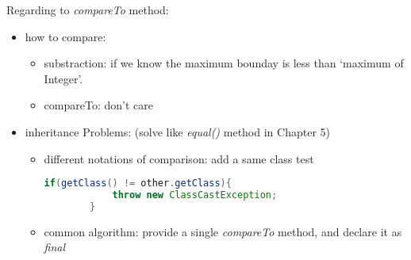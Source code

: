 \documentclass[12pt]{article}
\begin{document}
Regarding to \textit{compareTo} method:
\begin{itemize}
    \item how to compare:
    \begin{itemize}
        \item substraction: if we know the maximum bounday is less than `maximum of Integer'.
        \item compareTo: don't care
    \end{itemize}
    \item inheritance Problems: (solve like \emph{equal()} method in Chapter 5)
    \begin{itemize}
        \item different notations of comparison: add a same class test
        \begin{lstlisting}[language=Java]
        if(getClass() != other.getClass){
            throw new ClassCastException;
        }    
        \end{lstlisting}
        \item common algorithm: provide a single \emph{compareTo} method, and declare it as \emph{final}
    \end{itemize}
\end{itemize}
\end{document}
